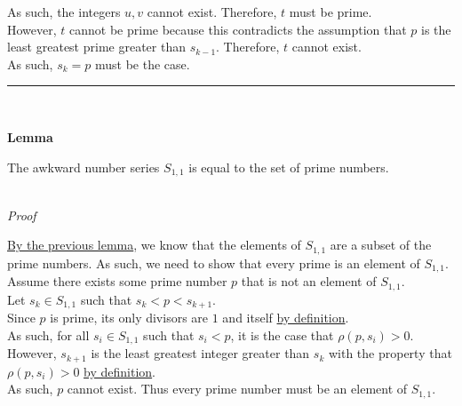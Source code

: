 \documentclass[a4paper,12pt]{article}
\begin{document}
\noindent As such, the integers $u, v$ cannot exist. Therefore, $t$ must be prime.\\

\noindent However, $t$ cannot be prime because this contradicts the assumption that $p$ is the least greatest prime greater than $s_{k - 1}$. Therefore, $t$ cannot exist.\\

\noindent As such, $s_k = p$ must be the case. 

\begin{center}
\noindent\rule{8cm}{0.4pt}
\end{center}
\noindent \\






\label{lemma:prime_asn}
\hypertarget{lemma:prime_asn}{}
\begin{tcolorbox}
\textbf{Lemma}

The awkward number series $S_{1, 1}$ is equal to the set of prime numbers.
\end{tcolorbox}

\noindent \\
\textit{Proof}

\noindent \hyperlink{lemma:asn_subset_prime}{By the previous lemma}, we know that the elements of $S_{1, 1}$ are a subset of the prime numbers. As such, we need to show that every prime is an element of $S_{1, 1}$.\\

\noindent Assume there exists some prime number $p$ that is not an element of $S_{1, 1}$.\\

\noindent Let $s_k \in S_{1, 1}$ such that $s_k < p < s_{k + 1}$.\\

\noindent Since $p$ is prime, its only divisors are $1$ and itself \hyperlink{definition:prime_numbers}{by definition}.\\

\noindent As such, for all $s_i \in S_{1, 1}$ such that $s_i < p$, it is the case that $\rho(p, s_i) > 0$.\\

\noindent However, $s_{k + 1}$ is the least greatest integer greater than $s_k$ with the property that $\rho(p, s_i) > 0$ \hyperlink{definition:awkward_number_series}{by definition}.\\

\noindent As such, $p$ cannot exist. Thus every prime number must be an element of $S_{1, 1}$.
\end{document}
